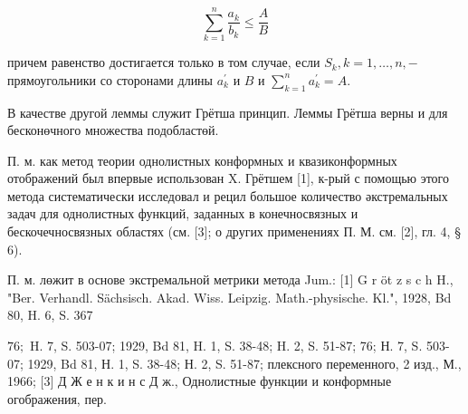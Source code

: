 \documentclass[10pt]{article}
\begin{document}
\[

\sum_{k=1}^{n} \frac{a_{k}}{b_{k}} \leqslant \frac{A}{B}

\]



причем равенство достигается только в том случае, если $S_{k}, k=1, \ldots, n,-$ прямоугольники со сторонами длины $a_{k}^{\prime}$ и $B$ и $\sum_{k=1}^{n} a_{k}^{\prime}=A$.



В качестве другой леммы служит Грётша принцип. Леммы Грётша верны и для бесконөчного множества подобластөй.



П. м. как метод теории однолистных конформных и квазиконформных отображений был впервые использован X. Грётшем [1], к-рый с помощью этого метода систематически исследовал и рецил большое количество әкстремальных задач для однолистных функций, заданных в конечносвязных и бескочечносвязных областях (см. [3]; о других применениях П. М. см. [2], гл. 4, § 6).



П. м. лөжит в основе экстремальной метрики метода Jum.: [1] G r öt z s c h H., "Ber. Verhandl. Sächsisch. Akad. Wiss. Leipzig. Math.-physische. Kl.", 1928, Bd 80, H. 6, S. 367

$76 ;$ H. 7, S. 503-07; 1929, Bd 81, H. 1, S. 38-48; H. 2, S. 51-87; 76; Н. 7, S. 503-07; 1929, Bd 81, Н. 1, S. 38-48; Н. 2, S. 51-87; плексного переменного, 2 изд., М., 1966; [3] Д Ж е н к и н с Д ж., Однолистные функции и конформные огображения, пер.
\end{document}
